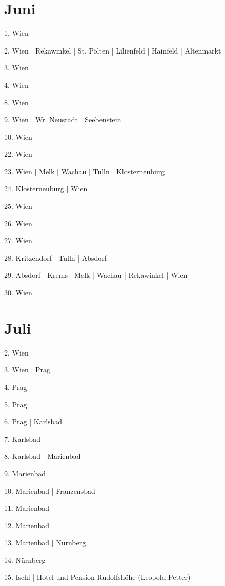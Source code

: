 \documentclass[twoside=false,titlepage=false,open=any, parskip=never, fontsize=10pt, headings=small, chapterprefix=false, appendixprefix=false, DIV=15]{scrbook}
\begin{document}
\begin{multicols}{3}
            \section*{Juni}
            1. Wien\par
            2. Wien | Rekawinkel | St. Pölten | Lilienfeld | Hainfeld | Altenmarkt\par
            3. Wien\par
            4. Wien\par
            8. Wien\par
            9. Wien | Wr. Neustadt | Seebenstein\par
            10. Wien\par
            22. Wien\par
            23. Wien | Melk | Wachau | Tulln | Klosterneuburg\par
            24. Klosterneuburg | Wien\par
            25. Wien\par
            26. Wien\par
            27. Wien\par
            28. Kritzendorf | Tulln | Absdorf\par
            29. Absdorf | Krems | Melk | Wachau | Rekawinkel | Wien\par
            30. Wien\par
            \section*{Juli}
            2. Wien\par
            3. Wien | Prag\par
            4. Prag\par
            5. Prag\par
            6. Prag | Karlsbad\par
            7. Karlsbad\par
            8. Karlsbad | Marienbad\par
            9. Marienbad\par
            10. Marienbad | Franzensbad\par
            11. Marienbad\par
            12. Marienbad\par
            13. Marienbad | Nürnberg\par
            14. Nürnberg\par
            15. Ischl | Hotel und Pension Rudolfshöhe (Leopold Petter)\par

\end{multicols}
\end{document}
